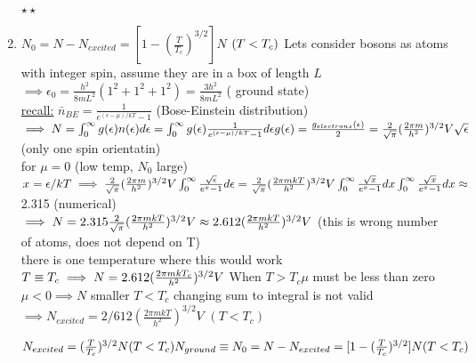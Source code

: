 \documentclass[12pt]{amsart}
\begin{document}
\begin{enumerate}
$\star \star$
\item \underline{$N_0 = N - N_{excited} = [1- ( \frac{T}{T_c})^{3/2}] N$} $(T< T_c)\\$
Lets consider bosons as atoms with integer spin, assume they are in a box of length $L$\\
$\implies \epsilon_0 = \frac{h^2}{8 mL^2}(1^2 + 1^2 + 1^2) = \frac{3 h^2}{8 m L^2}$ ( ground state)\\
\underline{recall:} $\bar{n}_{BE} = \frac{1}{e^{(\epsilon- \mu)/kT}-1}$ (Bose-Einstein distribution)\\ 
$\implies N = \int_0^{\infty} g(\epsilon) n(\epsilon) d \epsilon = \int_0^{\infty} g(\epsilon) \frac{1}{e^{(\epsilon- \mu)/kT} -1} d \epsilon \\
g(\epsilon) = \frac{g_{electrons} ( \epsilon)}{2} = \frac{2}{\sqrt{\pi}} ( \frac{2 \pi m}{h^2})^{3/2} V \sqrt{\epsilon}\\$
(only one spin orientatin)\\
for $\mu = 0$ (low temp, $N_0$ large)\\
$x= \epsilon/kT\\
\implies \frac{2}{\sqrt{\pi}} (\frac{2 \pi m}{h^2})^{3/2} V \int_0^{\infty} \frac{\sqrt{\epsilon}}{e^x -1} d \epsilon\\
= \frac{2}{\sqrt{\pi}} (\frac{2 \pi m k T}{h^2})^{3/2} V \int_0^{\infty} \frac{\sqrt{x}}{e^x-1} dx\\
\int_0^{\infty} \frac{\sqrt{x}}{e^x-1} dx \approx$ 2.315 (numerical)\\
$\implies N = 2.315 \frac{2}{\sqrt{\pi}} (\frac{2 \pi m kT}{h^2})^{3/2} V\\
\approx 2.612 (\frac{2 \pi m k T}{h^2})^{3/2} V$ (this is wrong number of atoms, does not depend on T)\\
there is one temperature where this would work $T \equiv T_c\\
\implies N= 2.612 (\frac{2 \pi m k T_c}{h^2})^{3/2} V \\$
When $T>T_c \mu$ must be less than zero $\mu<0 \implies N$ smaller $T<T_c$ changing sum to integral is not valid\\
$\implies N_{excited} = 2/612 (\frac{2 \pi m k T}{h^2})^{3/2} V\,\, (T<T_c)$\\


\hdashrule[0.5ex][c]{\linewidth}{0.5pt}{1.5mm}


$N_{excited} = ( \frac{T}{T_c})^{3/2} N (T<T_c)\\
N_{ground} \equiv N_0 = N - N_{excited} = [1- (\frac{T}{T_c})^{3/2}]N (T<T_c)\\$



\end{enumerate}
\end{document}
